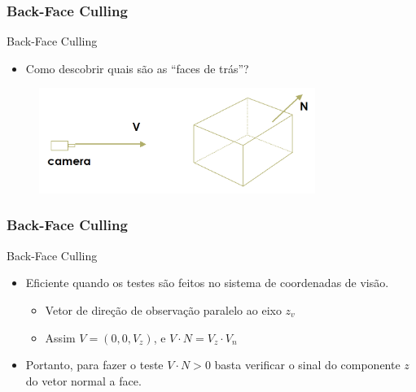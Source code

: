 \documentclass{beamer}
\begin{document}
\begin{frame}
\frametitle{Back-Face Culling}

		\begin{block}{Back-Face Culling}
			\begin{itemize}	
				\item Como descobrir quais são as ``faces de trás''?
			\end{itemize}
		\end{block}


		\begin{figure}[!h]
			\begin{center}
				\includegraphics[width=0.8\textwidth]{Figures/CamCub}
			\end{center}
		\end{figure}
		
\end{frame}

\begin{frame}
\frametitle{Back-Face Culling}

		\begin{block}{Back-Face Culling}
			\begin{itemize}	
				\item Eficiente quando os testes são feitos no sistema de coordenadas de visão.
					\begin{itemize}
						\item Vetor de direção de observação paralelo ao eixo $z_v$
						\item Assim $V = (0, 0, V_z)$, e $V \cdot N = V_z \cdot V_n$
					\end{itemize}
			\end{itemize}
		\end{block}

		\begin{block}{}
			\begin{itemize}
				\item Portanto, para fazer o teste $V \cdot N > 0$ basta verificar o sinal do componente $z$ do vetor normal a face.
			\end{itemize}
		
		\end{block}
		
\end{frame}
\end{document}
